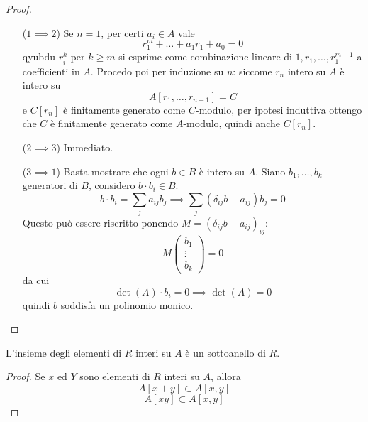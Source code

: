\begin{proof}\
	\begin{itemize}
		\item[($1\implies 2$)] Se $n=1$, per certi $a_i\in A$ vale 
		\begin{equation*}
		r_1^m+\dots+a_1r_1+a_0=0
		\end{equation*}
		qyubdu $r_i^k$ per $k\geq m$ si esprime come combinazione lineare di $1,r_1,\dots,r_1^{m-1}$ a coefficienti in $A$. Procedo poi per induzione su $n$: siccome $r_n$ intero su $A$ è intero su 
		\begin{equation*}
			A[r_1,\dots,r_{n-1}]=C
		\end{equation*}
		e $C[r_n]$ è finitamente generato come $C$-modulo, per ipotesi induttiva ottengo che $C$ è finitamente generato come $A$-modulo, quindi anche $C[r_n]$.
		\item[($2\implies 3$)] Immediato.
		\item[($3\implies 1$)] Basta mostrare che ogni $b\in B$ è intero su $A$. Siano $b_1,\dots,b_k$ generatori di $B$, considero $b\cdot b_i \in B$.
		\begin{equation*}
		 b\cdot b_i = \sum_j a_{ij}b_j \implies \sum_j(\delta_{ij}b-a_{ij})b_j=0
		\end{equation*}
		Questo può essere riscritto ponendo $M=(\delta_{ij}b-a_{ij})_{ij}$:
		\begin{equation*}
		M
		\begin{pmatrix}
		b_1\\ \vdots \\ b_k
		\end{pmatrix}
		=0
		\end{equation*}
		da cui
		\begin{equation*}
		\det(A)\cdot b_i=0 \implies \det(A)=0
		\end{equation*}
		quindi $b$ soddisfa un polinomio monico.
	\end{itemize}
\end{proof}
\begin{corollario}
	L'insieme degli elementi di $R$ interi su $A$ è un sottoanello di $R$.
\end{corollario}
\begin{proof}
	Se $x$ ed $Y$ sono elementi di $R$ interi su $A$, allora 
	\begin{equation*}
	A[x+y]\subset A[x,y]
	\end{equation*}
	\begin{equation*}
	A[xy]\subset A[x,y]
	\end{equation*}
\end{proof}




